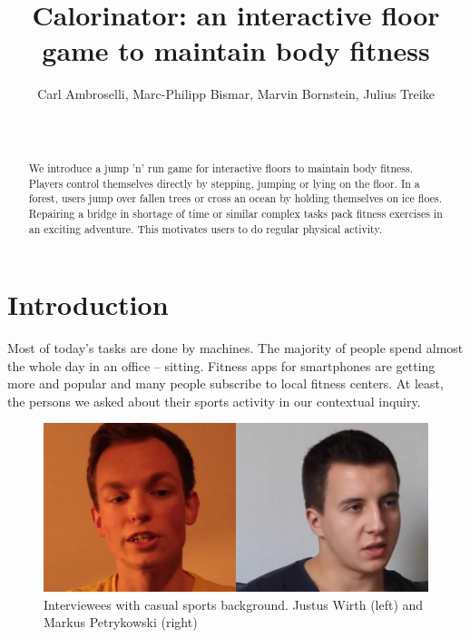 \documentclass{sigchi}
\begin{document}
  \title{Calorinator: an interactive floor game to maintain body fitness}

  \author{
    \alignauthor Carl Ambroselli, Marc-Philipp Bismar, Marvin Bornstein, Julius Treike\\
    \\
    \\
  }

  \maketitle

  \begin{abstract}
    We introduce a jump 'n' run game for interactive floors to maintain body fitness. Players control themselves directly by stepping, jumping or lying on the floor. In a forest, users jump over fallen trees or cross an ocean by holding themselves on ice floes. Repairing a bridge in shortage of time or similar complex tasks pack fitness exercises in an exciting adventure. This motivates users to do regular physical activity.
  \end{abstract}

  \section{Introduction}
    Most of today's tasks are done by machines. The majority of people spend almost the whole day in an office -- sitting.
    Fitness apps for smartphones are getting more and popular and many people subscribe to local fitness centers. 
    At least, the persons we asked about their sports activity in our contextual inquiry. 

    \begin{figure}[ht]
      \centering
      \includegraphics[width=\columnwidth]{users_casual}
      \caption{Interviewees with casual sports background. Justus Wirth (left) and Markus Petrykowski (right)}
      \label{fig:users_casual}
    \end{figure}
\end{document}
